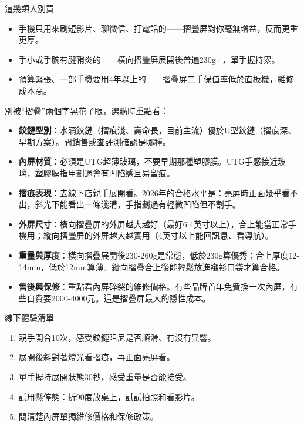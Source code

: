 \begin{tcbwarn}{這幾類人別買}
\begin{itemize}
  \item 手機只用來刷短影片、聊微信、打電話的——摺疊屏對你毫無增益，反而更重更厚。
  \item 手小或手腕有腱鞘炎的——橫向摺疊屏展開後普遍230g+，單手握持累。
  \item 預算緊張、一部手機要用4年以上的——摺疊屏二手保值率低於直板機，維修成本高。
\end{itemize}

\end{tcbwarn}


別被“摺疊”兩個字晃花了眼，選購時重點看：

\begin{itemize}
  \item \textbf{鉸鏈型別}：水滴鉸鏈（摺痕淺、壽命長，目前主流）優於U型鉸鏈（摺痕深、早期方案）。問銷售或查評測確認是哪種。
  \item \textbf{內屏材質}：必須是UTG超薄玻璃，不要早期那種塑膠膜。UTG手感接近玻璃，塑膠膜指甲劃過會有凹陷感且易留痕。
  \item \textbf{摺痕表現}：去線下店親手展開看。2026年的合格水平是：亮屏時正面幾乎看不出，斜光下能看出一條淺溝，手指劃過有輕微凹陷但不割手。
  \item \textbf{外屏尺寸}：橫向摺疊屏的外屏越大越好（最好6.4英寸以上），合上能當正常手機用；縱向摺疊屏的外屏越大越實用（4英寸以上能回訊息、看導航）。
  \item \textbf{重量與厚度}：橫向摺疊展開後230-260g是常態，低於230g算優秀；合上厚度12-14mm，低於12mm算薄。縱向摺疊合上後能輕鬆放進襯衫口袋才算合格。
  \item \textbf{售後與保修}：重點看內屏碎裂的維修價格。有些品牌首年免費換一次內屏，有些自費要2000-4000元。這是摺疊屏最大的隱性成本。
\end{itemize}

\begin{tcbpractice}{線下體驗清單}
\begin{enumerate}
  \item 親手開合10次，感受鉸鏈阻尼是否順滑、有沒有異響。
  \item 展開後斜對著燈光看摺痕，再正面亮屏看。
  \item 單手握持展開狀態30秒，感受重量是否能接受。
  \item 試用懸停態：折90度放桌上，試試拍照和看影片。
  \item 問清楚內屏單獨維修價格和保修政策。
\end{enumerate}

\end{tcbpractice}

